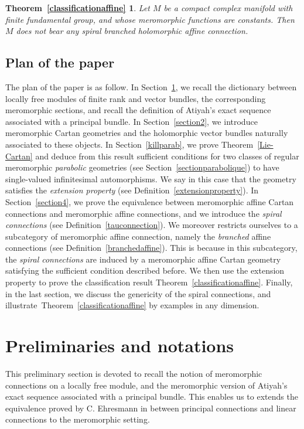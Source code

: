 \documentclass[10pt,a4paper]{amsart}
\numberwithin{equation}{section}
\newtheorem*{Theorem-5.11}{Theorem~\ref{classificationaffine}}
\begin{document}
\begin{Theorem-5.11}\label{classificationaffine-Int} Let $M$ be a compact complex manifold with finite fundamental group, and whose meromorphic functions are constants. Then $M$ does not bear any spiral branched holomorphic affine connection.
\end{Theorem-5.11}

\subsection{Plan of the paper}
The plan of the paper is as follow. In Section~\ref{section1}, we recall the dictionary between locally free modules of finite rank and vector bundles, the corresponding meromorphic sections, and recall the definition of Atiyah's exact sequence associated with a principal bundle. In Section~\ref{section2}, we introduce meromorphic Cartan geometries and the holomorphic vector bundles naturally associated to these objects. In Section~\ref{killparab}, we prove Theorem~\ref{Lie-Cartan} and deduce from this result sufficient conditions for two classes of regular meromorphic \textit{parabolic} geometries (see Section~\ref{sectionparabolique}) to have single-valued infinitesimal automorphisms. We say in this case that the geometry satisfies the \textit{extension property} (see Definition~\ref{extensionproperty}). In Section~\ref{section4}, we prove the equivalence between meromorphic affine Cartan connections and meromorphic affine connections, and we introduce the \textit{spiral connections} (see Definition~\ref{tauconnection}). We moreover restricts ourselves to a subcategory of meromorphic affine connection, namely the \textit{branched} affine connections (see Definition~\ref{branchedaffine}). This is because in this subcategory, the \textit{spiral connections} are induced by a meromorphic affine Cartan geometry satisfying the sufficient condition described before. We then use the extension property to prove the classification result Theorem~\ref{classificationaffine}. Finally, in the last section, we discuss the genericity of the spiral connections, and illustrate~Theorem~\ref{classificationaffine} by examples in any dimension.

 \section{Preliminaries and notations}\label{section1}
This preliminary section is devoted to recall the notion of meromorphic connections on a locally free module, and the meromorphic version of Atiyah's exact sequence associated with a principal bundle. This enables us to extends the equivalence proved by C. Ehresmann in \cite{Erhesmanh} between principal connections and linear connections to the meromorphic setting.
\end{document}
